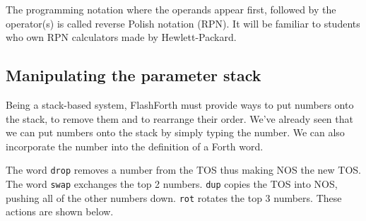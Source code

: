 \documentclass[12pt,a4paper]{article}
\begin{document}
\medskip
The programming notation where the operands appear first,
followed by the operator(s) is called reverse Polish notation (RPN).
It will be familiar to students who own RPN calculators made by Hewlett-Packard.


\medskip
\subsection{Manipulating the parameter stack}
\label{sec:parameter-stack}
%
Being a stack-based system, FlashForth must provide ways to put numbers onto the stack,
to remove them and to rearrange their order.
We've already seen that we can put numbers onto the stack by simply typing the number.
We can also incorporate the number into the definition of a Forth word.

\medskip
The word \verb!drop! removes a number from the TOS thus making NOS the new TOS.
The word \verb!swap! exchanges the top 2 numbers.
\verb!dup! copies the TOS into NOS, pushing all of the other numbers down.
\verb!rot! rotates the top 3 numbers.
These actions are shown below.
\end{document}

